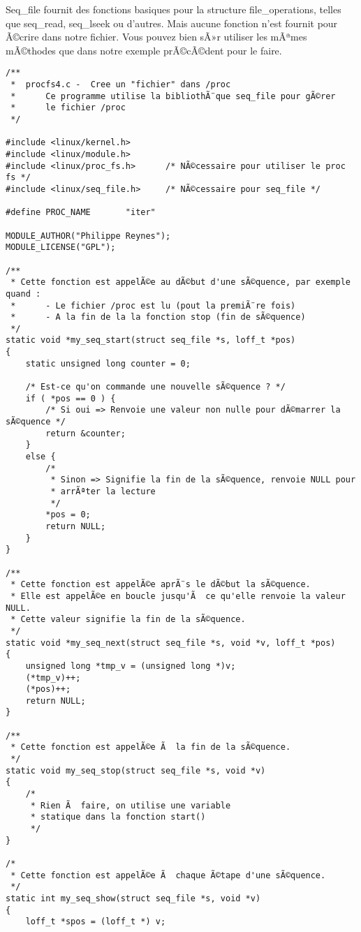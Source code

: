 \documentclass[11pt]{article}
\begin{document}
Seq\_file fournit des fonctions basiques pour la structure file\_operations, telles que seq\_read, seq\_lseek ou d'autres. Mais aucune fonction n'est fournit pour Ã©crire dans notre fichier. Vous pouvez bien sÃ»r utiliser les mÃªmes mÃ©thodes que dans notre exemple prÃ©cÃ©dent pour le faire.

\begin{verbatim}
/**
 *  procfs4.c -  Cree un "fichier" dans /proc
 *      Ce programme utilise la bibliothÃ¨que seq_file pour gÃ©rer
 *      le fichier /proc
 */

#include <linux/kernel.h>
#include <linux/module.h>
#include <linux/proc_fs.h>      /* NÃ©cessaire pour utiliser le proc fs */
#include <linux/seq_file.h>     /* NÃ©cessaire pour seq_file */

#define PROC_NAME       "iter"

MODULE_AUTHOR("Philippe Reynes");
MODULE_LICENSE("GPL");

/**
 * Cette fonction est appelÃ©e au dÃ©but d'une sÃ©quence, par exemple quand :
 *      - Le fichier /proc est lu (pout la premiÃ¨re fois)
 *      - A la fin de la la fonction stop (fin de sÃ©quence)
 */
static void *my_seq_start(struct seq_file *s, loff_t *pos)
{
    static unsigned long counter = 0;

    /* Est-ce qu'on commande une nouvelle sÃ©quence ? */
    if ( *pos == 0 ) {
        /* Si oui => Renvoie une valeur non nulle pour dÃ©marrer la sÃ©quence */
        return &counter;
    }
    else {
        /*
         * Sinon => Signifie la fin de la sÃ©quence, renvoie NULL pour
         * arrÃªter la lecture
         */
        *pos = 0;
        return NULL;
    }
}

/**
 * Cette fonction est appelÃ©e aprÃ¨s le dÃ©but la sÃ©quence.
 * Elle est appelÃ©e en boucle jusqu'Ã  ce qu'elle renvoie la valeur NULL.
 * Cette valeur signifie la fin de la sÃ©quence.
 */
static void *my_seq_next(struct seq_file *s, void *v, loff_t *pos)
{
    unsigned long *tmp_v = (unsigned long *)v;
    (*tmp_v)++;
    (*pos)++;
    return NULL;
}

/**
 * Cette fonction est appelÃ©e Ã  la fin de la sÃ©quence.
 */
static void my_seq_stop(struct seq_file *s, void *v)
{
    /*
     * Rien Ã  faire, on utilise une variable
     * statique dans la fonction start()
     */
}

/*
 * Cette fonction est appelÃ©e Ã  chaque Ã©tape d'une sÃ©quence.
 */
static int my_seq_show(struct seq_file *s, void *v)
{
    loff_t *spos = (loff_t *) v;


\end{verbatim}
\end{document}
